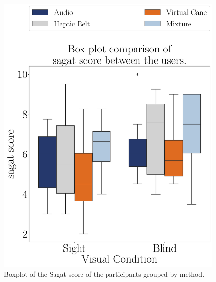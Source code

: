 \begin{figure}[!htb]
    \centering
    \begin{minipage}{0.45\textwidth}
        \centering
        \includegraphics[width = \textwidth]{Resultados/Sagat/Figuras/pdf/boxplot_sagat_4_scene.pdf}
        \caption{Boxplot of the Sagat score of the participants grouped by method.}
        \label{fig:boxplot_sagat_4_scene}
    \end{minipage}
    \begin{minipage}{0.075\textwidth}
        \hfill
    \end{minipage}
    \begin{minipage}{0.45\textwidth}
        \centering

\end{minipage}
\end{figure}
